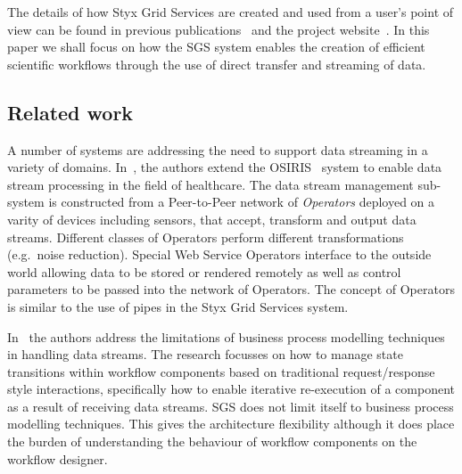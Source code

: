 \documentclass[a4paper]{article}
\begin{document}
The details of how Styx Grid Services are created and used from a user's point of view can be found in previous publications~\cite{blower:2005, blower_lncs:2006, blower_escience:2006} and the project website~\cite{sgswebsite}.  In this paper we shall focus on how the SGS system enables the creation of efficient scientific workflows through the use of direct transfer and streaming of data.

\subsection{Related work}\label{sec:related}

A number of systems are addressing the need to support data streaming in a variety of domains. In~\cite{brettlecker:2004}, the authors extend the OSIRIS~\cite{schuler:2003} system to enable data stream processing in the field of healthcare. The data stream management sub-system is constructed from a Peer-to-Peer network of \emph{Operators} deployed on a varity of devices including sensors, that accept, transform and output data streams. Different classes of Operators perform different transformations (e.g.\ noise reduction). Special Web Service Operators interface to the outside world allowing data to be stored or rendered remotely as well as control parameters to be passed into the network of Operators. The concept of Operators is similar to the use of pipes in the Styx Grid Services system.

In~\cite{bioernstad:2006} the authors address the limitations of business process modelling techniques in handling data streams. The research focusses on how to manage state transitions within workflow components based on traditional request/response style interactions, specifically how to enable iterative re-execution of a component as a result of receiving data streams. SGS does not limit itself to business process modelling techniques. This gives the architecture flexibility although it does place the burden of understanding the behaviour of workflow components on the workflow designer.
\end{document}
